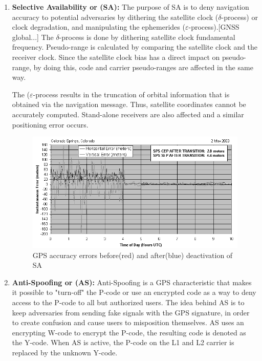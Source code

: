 \documentclass[conference]{IEEEtran}
\begin{document}
\begin{enumerate}

    \item \textbf{Selective Availability or (SA):}
    The purpose of SA is to deny navigation accuracy to potential adversaries by dithering the satellite clock (\(\delta\)-process) or clock degradation, and manipulating the ephemerides (\(\varepsilon\)-process).[GNSS global...] The \(\delta\)-process is done by dithering satellite clock fundamental frequency. Pseudo-range is calculated by comparing the satellite clock and the receiver clock. Since the satellite clock bias has a direct impact on pseudo-range, by doing this, code and carrier pseudo-ranges are affected in the same way.\par
    The (\(\varepsilon\)-process results in the truncation of orbital information that is obtained via the navigation message. Thus, satellite coordinates cannot be accurately computed. Stand-alone receivers are also affected and a similar positioning error occurs.
    
    \begin{figure}[ht]
        \centering
        \includegraphics[width=\columnwidth]{fig6.png}
        \caption{GPS accuracy errors before(red) and after(blue) deactivation of SA}
    \end{figure}
    
    \item \textbf{Anti-Spoofing or (AS):}
    Anti-Spoofing is a GPS characteristic that makes it possible to "turn-off" the P-code or use an encrypted code as a way to deny access to the P-code to all but authorized users. The idea behind AS is to keep adversaries from sending fake signals with the GPS signature, in order to create confusion and cause users to misposition themselves.
    AS uses an encrypting W-code to encrypt the P-code, the resulting code is denoted as the Y-code. When AS is active, the P-code on the L1 and L2 carrier is replaced by the unknown Y-code.
    
\end{enumerate}
\end{document}
